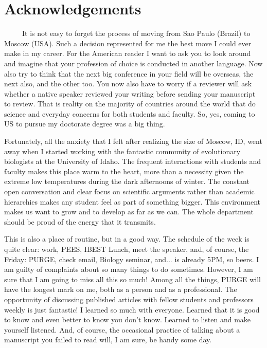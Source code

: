 \pagebreak

\section*{\large{Acknowledgements}}

\ \ \ \ \ It is not easy to forget the process of moving from Sao Paulo (Brazil) to Moscow (USA). Such a decision represented for me the best move I could ever make in my career. For the American reader I want to ask you to look around and imagine that your profession of choice is conducted in another language. Now also try to think that the next big conference in your field will be overseas, the next also, and the other too. You now also have to worry if a reviewer will ask whether a native speaker reviewed your writing before sending your manuscript to review. That is reality on the majority of countries around the world that do science and everyday concerns for both students and faculty. So, yes, coming to US to pursue my doctorate degree was a big thing.

Fortunately, all the anxiety that I felt after realizing the size of Moscow, ID, went away when I started working with the fantastic community of evolutionary biologists at the University of Idaho. The frequent interactions with students and faculty makes this place warm to the heart, more than a necessity given the extreme low temperatures during the dark afternoons of winter. The constant open conversation and clear focus on scientific arguments rather than academic hierarchies makes any student feel as part of something bigger. This environment makes us want to grow and to develop as far as we can. The whole department should be proud of the energy that it transmits.

This is also a place of routine, but in a good way. The schedule of the week is quite clear: work, PEES, IBEST Lunch, meet the speaker, and, of course, the Friday: PURGE, check email, Biology seminar, and... is already 5PM, so beers. I am guilty of complaints about so many things to do sometimes. However, I am sure that I am going to miss all this so much! Among all the things, PURGE will have the longest mark on me, both as a person and as a professional. The opportunity of discussing published articles with fellow students and professors weekly is just fantastic! I learned so much with everyone. Learned that it is good to know and even better to know you don't know. Learned to listen and make yourself listened. And, of course, the occasional practice of talking about a manuscript you failed to read will, I am sure, be handy some day.

